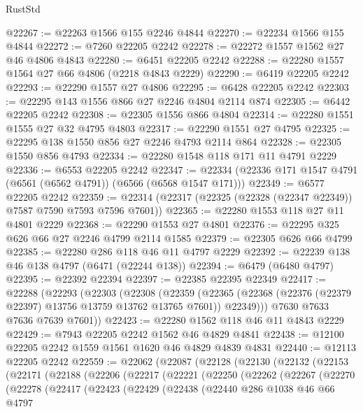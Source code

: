 \begin{lexlean}{RustStd}
\begin{coremodule}
@22267 := @22263 @1566 @155 @2246 @4844
@22270 := @22234 @1566 @155 @4844
@22272 := @7260 @22205 @2242
@22278 := @22272 @1557 @1562 @27 @46 @4806 @4843
@22280 := @6451 @22205 @2242
@22288 := @22280 @1557 @1564 @27 @66 @4806 (@2218 @4843 @2229)
@22290 := @6419 @22205 @2242
@22293 := @22290 @1557 @27 @4806
@22295 := @6428 @22205 @2242
@22303 := @22295 @143 @1556 @866 @27 @2246 @4804 @2114 @874
@22305 := @6442 @22205 @2242
@22308 := @22305 @1556 @866 @4804
@22314 := @22280 @1551 @1555 @27 @32 @4795 @4803
@22317 := @22290 @1551 @27 @4795
@22325 := @22295 @138 @1550 @856 @27 @2246 @4793 @2114 @864
@22328 := @22305 @1550 @856 @4793
@22334 := @22280 @1548 @118 @171 @11 @4791 @2229
@22336 := @6553 @22205 @2242
@22347 := @22334 (@22336 @171 @1547 @4791 (@6561 (@6562 @4791)) (@6566 (@6568 @1547 @171)))
@22349 := @6577 @22205 @2242
@22359 := @22314 (@22317 (@22325 (@22328 (@22347 @22349)) @7587 @7590 @7593 @7596 @7601))
@22365 := @22280 @1553 @118 @27 @11 @4801 @2229
@22368 := @22290 @1553 @27 @4801
@22376 := @22295 @325 @626 @66 @27 @2246 @4799 @2114 @1585
@22379 := @22305 @626 @66 @4799
@22385 := @22280 @286 @118 @46 @11 @4797 @2229
@22392 := @22239 @138 @46 @138 @4797 (@6471 (@22244 @138))
@22394 := @6479 (@6480 @4797)
@22395 := @22392 @22394
@22397 := @22385 @22395 @22349
@22417 := @22288
    (@22293
      (@22303
        (@22308
          (@22359
            (@22365 (@22368 (@22376 (@22379 @22397) @13756 @13759 @13762 @13765 @7601)) @22349)))
        @7630
        @7633
        @7636
        @7639
        @7601))
@22423 := @22280 @1562 @118 @46 @11 @4843 @2229
@22429 := @7943 @22205 @2242 @1562 @46 @4829 @4841
@22438 := @12100 @22205 @2242 @1559 @1561 @1620 @46 @4829 @4839 @4831
@22440 := @12113 @22205 @2242
@22559 := @22062
    (@22087
      (@22128
        (@22130
          (@22132
            (@22153
              (@22171
                (@22188
                  (@22206
                    (@22217
                      (@22221
                        (@22250
                          (@22262
                            (@22267
                              (@22270
                                (@22278
                                  (@22417
                                    (@22423
                                      (@22429
                                        (@22438
                                          (@22440
                                            @286
                                            @1038
                                            @46
                                            @66
                                            @4797

\end{coremodule}
\end{lexlean}
